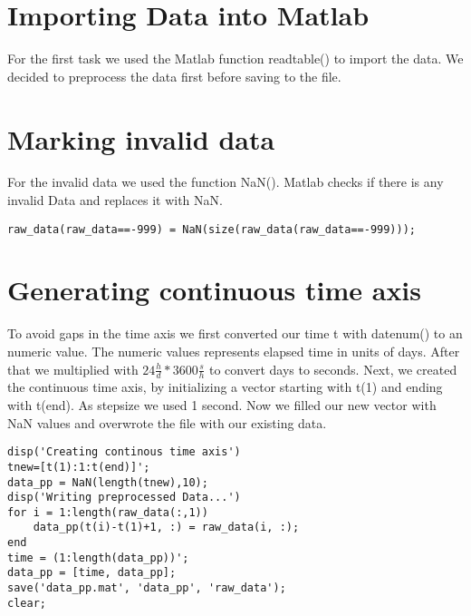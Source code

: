\documentclass[10pt]{article}
\begin{document}
\lstset{
	language=Matlab,
	basicstyle=\footnotesize,
	frame=tb,
	xleftmargin=.2\textwidth,
	xrightmargin=.2\textwidth
}
\onehalfspacing

\tableofcontents
\newpage
\section{Importing Data into Matlab}
For the first task we used the Matlab function readtable() to import the data. We decided to preprocess the data first before saving to the file.
\section{Marking invalid data}
For the invalid data we used the function NaN(). Matlab checks if there is any invalid Data and replaces it with NaN.\\
\begin{lstlisting}
raw_data(raw_data==-999) = NaN(size(raw_data(raw_data==-999)));
\end{lstlisting}
\section{Generating continuous time axis}
To avoid gaps in the time axis we first converted our time t with datenum() to an numeric value. The numeric values represents elapsed time in units of days. After that we multiplied with $24\frac{h}{d}*3600\frac{s}{h}$ to convert days to seconds. 
Next, we created the continuous time axis, by initializing a vector starting with t(1) and ending with t(end). As stepsize we used 1 second. 
Now we filled our new vector with NaN values and overwrote the file with our existing data.\\
\begin{lstlisting}
disp('Creating continous time axis')
tnew=[t(1):1:t(end)]';
data_pp = NaN(length(tnew),10);
disp('Writing preprocessed Data...')
for i = 1:length(raw_data(:,1))
    data_pp(t(i)-t(1)+1, :) = raw_data(i, :);
end
time = (1:length(data_pp))';
data_pp = [time, data_pp];
save('data_pp.mat', 'data_pp', 'raw_data');
clear;
\end{lstlisting}
\end{document}
